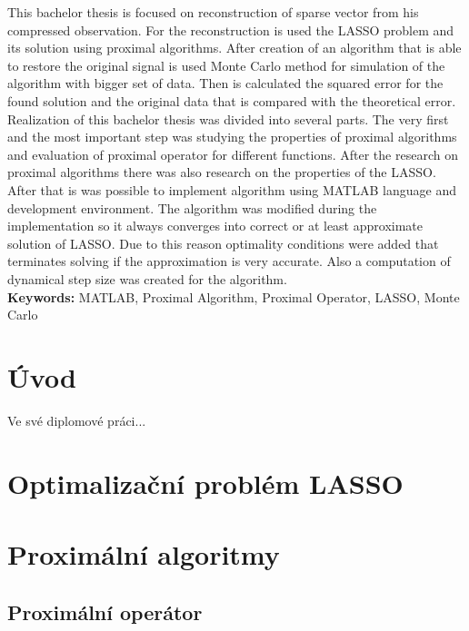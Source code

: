 \documentclass[FM,BP]{tulthesis}
\begin{document}
\vspace{2cm}
\begin{abstractEN}
\setlength\parindent{20pt} This bachelor thesis is focused on reconstruction of sparse vector from his compressed observation. For the reconstruction is used the LASSO problem and its solution using proximal algorithms. After creation of an algorithm that is able to restore the original signal is used Monte Carlo method for simulation of the algorithm with bigger set of data. Then is calculated the squared error for the found solution and the original data that is compared with the theoretical error.
\\

\setlength\parindent{20pt}Realization of this bachelor thesis was divided into several parts. The very first and the most important step was studying the properties of proximal algorithms and evaluation of proximal operator for different functions. After the research on proximal algorithms there was also research on the properties of the LASSO. After that is was possible to implement algorithm using MATLAB language and development environment. The algorithm was modified during the implementation so it always converges into correct or at least approximate solution of LASSO. Due to this reason optimality conditions were added that terminates solving if the approximation is very accurate. Also a computation of dynamical step size was created for the algorithm. 
\\

\textbf{Keywords:} MATLAB, Proximal Algorithm, Proximal Operator, LASSO, Monte Carlo
\end{abstractEN}
\clearpage
\tableofcontents
\pagebreak
\chapter{Úvod}
Ve své diplomové práci...

\chapter{Optimalizační problém LASSO}

\chapter{Proximální algoritmy}

\section{Proximální operátor}
\end{document}
